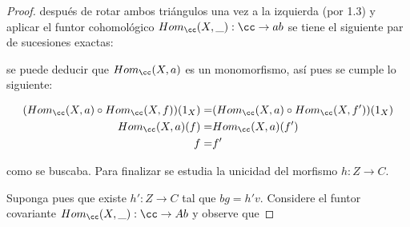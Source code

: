 \documentclass{article}
\begin{document}
\begin{enumerate}[label=\textbf{Ej \arabic*.}]
\begin{proof}
			después de rotar ambos triángulos una vez a la izquierda (por 1.3) y aplicar el funtor cohomol\'ogico $Hom_{\cc}(X,\_):\cc \to ab$ se tiene el siguiente par de sucesiones exactas:
			
			\begin{center}
			\end{center} 
			se puede deducir que $Hom_{\cc}(X,a)$ es un monomorfismo, así pues se cumple lo siguiente:
			
			\begin{align*}
				(Hom_{\cc}(X,a)\circ Hom_{\cc}(X,f))(1_{X}) =& (Hom_{\cc}(X,a)\circ Hom_{\cc}(X,f'))(1_{X})\\
				Hom_{\cc}(X,a)(f) =& Hom_{\cc}(X,a)(f')\\
				f =& f'
			\end{align*}
			
			como se buscaba. Para finalizar se estudia la unicidad del morfismo $h:Z\to C$.
			
			\bigskip
			
			Suponga pues que existe $h':Z\to C$ tal que $bg=h'v$. Considere el funtor covariante $Hom_{\cc}(X,\_):\cc \to Ab$ y observe que 
			

\end{proof}
\end{enumerate}
\end{document}
